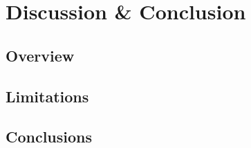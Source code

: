 \chapter{Discussion \& Conclusion}\label{ch07}

\section{Overview}


\section{Limitations}


\section{Conclusions}


